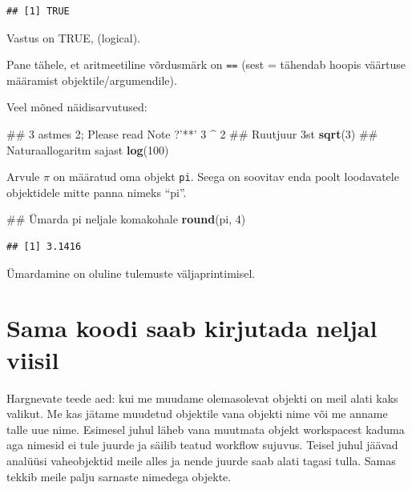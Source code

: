 \documentclass[]{book}
\newenvironment{Shaded}{\begin{snugshade}}{\end{snugshade}}
\newcommand{\KeywordTok}[1]{\textcolor[rgb]{0.13,0.29,0.53}{\textbf{#1}}}
\newcommand{\DecValTok}[1]{\textcolor[rgb]{0.00,0.00,0.81}{#1}}
\newcommand{\StringTok}[1]{\textcolor[rgb]{0.31,0.60,0.02}{#1}}
\newcommand{\OperatorTok}[1]{\textcolor[rgb]{0.81,0.36,0.00}{\textbf{#1}}}
\newcommand{\NormalTok}[1]{#1}
\begin{document}
\begin{verbatim}
## [1] TRUE
\end{verbatim}

Vastus on TRUE, (logical).

Pane tähele, et aritmeetiline võrdusmärk on \texttt{==} (sest = tähendab
hoopis väärtuse määramist objektile/argumendile).

Veel mõned näidisarvutused:

\begin{Shaded}
\begin{Highlighting}[]
\NormalTok{## 3 astmes 2; Please read Note ?'**' }
\DecValTok{3} \OperatorTok{^}\StringTok{ }\DecValTok{2}
\NormalTok{## Ruutjuur 3st}
\KeywordTok{sqrt}\NormalTok{(}\DecValTok{3}\NormalTok{)}
\NormalTok{## Naturaallogaritm sajast}
\KeywordTok{log}\NormalTok{(}\DecValTok{100}\NormalTok{)}
\end{Highlighting}
\end{Shaded}

Arvule \(\pi\) on määratud oma objekt \texttt{pi}. Seega on soovitav
enda poolt loodavatele objektidele mitte panna nimeks ``pi''.

\begin{Shaded}
\begin{Highlighting}[]
\NormalTok{## Ümarda pi neljale komakohale}
\KeywordTok{round}\NormalTok{(pi, }\DecValTok{4}\NormalTok{)}
\end{Highlighting}
\end{Shaded}

\begin{verbatim}
## [1] 3.1416
\end{verbatim}

Ümardamine on oluline tulemuste väljaprintimisel.

\section{Sama koodi saab kirjutada neljal
viisil}\label{sama-koodi-saab-kirjutada-neljal-viisil}

Hargnevate teede aed: kui me muudame olemasolevat objekti on meil alati
kaks valikut. Me kas jätame muudetud objektile vana objekti nime või me
anname talle uue nime. Esimesel juhul läheb vana muutmata objekt
workspacest kaduma aga nimesid ei tule juurde ja säilib teatud workflow
sujuvus. Teisel juhul jäävad analüüsi vaheobjektid meile alles ja nende
juurde saab alati tagasi tulla. Samas tekkib meile palju sarnaste
nimedega objekte.
\end{document}
